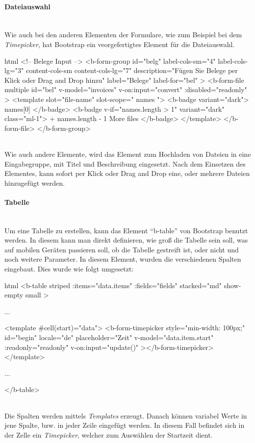 \paragraph{Dateiauswahl}
~\\
Wie auch bei den anderen Elementen der Formulare, wie zum Beispiel bei dem \textit{Timepicker}, hat Bootstrap ein veorgefertigtes Element für die Dateiauswahl. 
\begin{code}{html}
	<!-- Belege Input -->
	<b-form-group
	  id="belg"
	  label-cols-sm="4"
	  label-cols-lg="3"
	  content-cols-sm
	  content-cols-lg="7"
	  description="Fügen Sie Belege per Klick oder Drag and Drop hinzu"
	  label="Belege"
	  label-for="bel"
	>
	  <b-form-file
		multiple
		id="bel"
		v-model="invoices"
		v-on:input="convert"
		:disabled="readonly"
	  >
		<template slot="file-name" slot-scope="{ names }">
		  <b-badge variant="dark">{{ names[0] }}</b-badge>
		  <b-badge v-if="names.length > 1" variant="dark" class="ml-1">
			+ {{ names.length - 1 }} More files
		  </b-badge>
		</template>
	  </b-form-file>
	</b-form-group>
\end{code}
	\label{list:dateiselect} ~\\
Wie auch andere Elemente, wird das Element zum Hochladen von Dateien in eine Eingabegruppe, mit Titel und Beschreibung eingesetzt. Nach dem Einsetzen des Elementes, kann sofort per Klick oder Drag and Drop eine, oder mehrere Dateien hinzugefügt werden.
\paragraph{Tabelle}
~\\
Um eine Tabelle zu erstellen, kann das Element \enquote{b-table} von Bootstrap benutzt werden. In diesem kann man direkt definieren, wie groß die Tabelle sein soll, was auf mobilen Geräten passieren soll, ob die Tabelle gestreift ist, oder nicht und noch weitere Parameter. In diesem Element, wurden die verschiedenen Spalten eingebaut. Dies wurde wie folgt umgesetzt:
\begin{code}{html}
	<b-table
          striped
          :items="data.items"
          :fields="fields"
          stacked="md"
          show-empty
          small
    >

		...

		<template #cell(start)="data">
			<b-form-timepicker
				style="min-width: 100px;"
				id="begin"
				locale="de"
				placeholder="Zeit"
				v-model="data.item.start"
				:readonly="readonly"
				v-on:input="update()"
			></b-form-timepicker>
		</template>

		...

	</b-table>
\end{code}
	\label{list:bsptable} ~\\
Die Spalten werden mittels \textit{Templates} erzeugt. Danach können variabel Werte in jene Spalte, bzw. in jeder Zeile eingefügt werden. In diesem Fall befindet sich in der Zelle ein \textit{Timepicker}, welcher zum Auswählen der Startzeit dient.
\newpage
